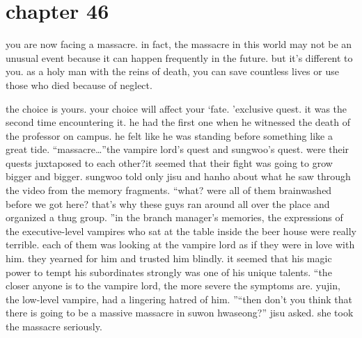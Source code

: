 \section{chapter 46}

                            you are now facing a massacre.
 in fact, the massacre in this world may not be an unusual event because it can happen frequently in the future.
 but it’s different to you.
 as a holy man with the reins of death, you can save countless lives or use those who died because of neglect.





the choice is yours.
your choice will affect your ‘fate.
’exclusive quest.
 it was the second time encountering it.
 he had the first one when he witnessed the death of the professor on campus.
 he felt like he was standing before something like a great tide.
“massacre…”the vampire lord’s quest and sungwoo’s quest.
 were their quests juxtaposed to each other?it seemed that their fight was going to grow bigger and bigger.
sungwoo told only jisu and hanho about what he saw through the video from the memory fragments.
“what? were all of them brainwashed before we got here? that’s why these guys ran around all over the place and organized a thug group.
”in the branch manager’s memories, the expressions of the executive-level vampires who sat at the table inside the beer house were really terrible.
 each of them was looking at the vampire lord as if they were in love with him.
 they yearned for him and trusted him blindly.
 it seemed that his magic power to tempt his subordinates strongly was one of his unique talents.
“the closer anyone is to the vampire lord, the more severe the symptoms are.
 yujin, the low-level vampire, had a lingering hatred of him.
”“then don’t you think that there is going to be a massive massacre in suwon hwaseong?” jisu asked.
 she took the massacre seriously.

